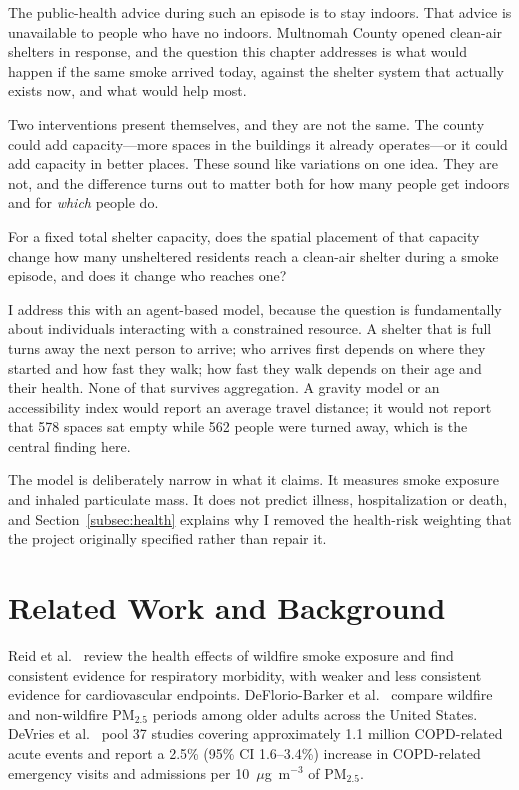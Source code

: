 \documentclass[graybox]{svmult}
\begin{document}
The public-health advice during such an episode is to stay indoors. That advice
is unavailable to people who have no indoors. Multnomah County opened clean-air
shelters in response, and the question this chapter addresses is what would
happen if the same smoke arrived today, against the shelter system that actually
exists now, and what would help most.

Two interventions present themselves, and they are not the same. The county
could add capacity---more spaces in the buildings it already operates---or it
could add capacity in better places. These sound like variations on one idea.
They are not, and the difference turns out to matter both for how many people
get indoors and for \emph{which} people do.

 For a fixed total shelter capacity, does the
spatial placement of that capacity change how many unsheltered residents reach a
clean-air shelter during a smoke episode, and does it change who reaches one?

I address this with an agent-based model, because the question is fundamentally
about individuals interacting with a constrained resource. A shelter that is
full turns away the next person to arrive; who arrives first depends on where
they started and how fast they walk; how fast they walk depends on their age and
their health. None of that survives aggregation. A gravity model or an
accessibility index would report an average travel distance; it would not report
that 578 spaces sat empty while 562 people were turned away, which is the
central finding here.

The model is deliberately narrow in what it claims. It measures smoke exposure
and inhaled particulate mass. It does not predict illness, hospitalization or
death, and Section~\ref{subsec:health} explains why I removed the health-risk
weighting that the project originally specified rather than repair it.

\section{Related Work and Background}
\label{sec:related}

 Reid et al.\ \cite{reid2016critical}
review the health effects of wildfire smoke exposure and find consistent
evidence for respiratory morbidity, with weaker and less consistent evidence for
cardiovascular endpoints. DeFlorio-Barker et al.\
\cite{deflorio2019cardiopulmonary} compare wildfire and non-wildfire PM$_{2.5}$
periods among older adults across the United States. DeVries et al.\
\cite{devries2017} pool 37 studies covering approximately 1.1 million
COPD-related acute events and report a 2.5\% (95\% CI 1.6--3.4\%) increase in
COPD-related emergency visits and admissions per 10~$\mu$g~m$^{-3}$ of
PM$_{2.5}$.
\end{document}
